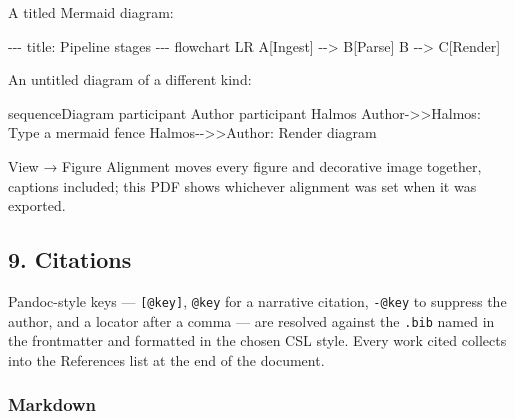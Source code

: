 \documentclass[
]{article}
\newenvironment{Shaded}{}{}
\newcommand{\NormalTok}[1]{#1}
\begin{document}
A titled Mermaid diagram:

\begin{Shaded}
\begin{Highlighting}[]
\NormalTok{{-}{-}{-}}
\NormalTok{title: Pipeline stages}
\NormalTok{{-}{-}{-}}
\NormalTok{flowchart LR}
\NormalTok{  A[Ingest] {-}{-}\textgreater{} B[Parse]}
\NormalTok{  B {-}{-}\textgreater{} C[Render]}
\end{Highlighting}
\end{Shaded}

An untitled diagram of a different kind:

\begin{Shaded}
\begin{Highlighting}[]
\NormalTok{sequenceDiagram}
\NormalTok{  participant Author}
\NormalTok{  participant Halmos}
\NormalTok{  Author{-}\textgreater{}\textgreater{}Halmos: Type a mermaid fence}
\NormalTok{  Halmos{-}{-}\textgreater{}\textgreater{}Author: Render diagram}
\end{Highlighting}
\end{Shaded}

View → Figure Alignment moves every figure and decorative image
together, captions included; this PDF shows whichever alignment was set
when it was exported.

\subsection{9. Citations}\label{citations}

Pandoc-style keys --- \texttt{{[}@key{]}}, \texttt{@key} for a narrative
citation, \texttt{-@key} to suppress the author, and a locator after a
comma --- are resolved against the \texttt{.bib} named in the
frontmatter and formatted in the chosen CSL style. Every work cited
collects into the References list at the end of the document.

\subsubsection{Markdown}\label{markdown-9}
\end{document}
